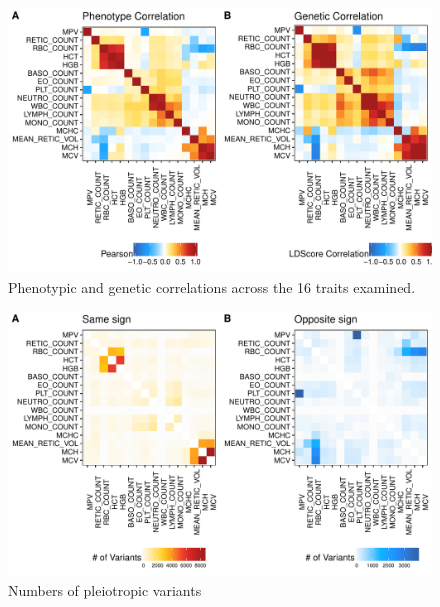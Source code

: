 \documentclass{article}\usepackage[]{graphicx}\usepackage[]{color}
\makeatletter
\def\maxwidth{ %
  \ifdim\Gin@nat@width>\linewidth
    \linewidth
  \else
    \Gin@nat@width
  \fi
}
\newenvironment{knitrout}{}{} %
\makeatother
\begin{document}
\begin{enumerate}[label=(\Alph*)]
\begin{knitrout}
\begin{figure}[H]
{\centering \includegraphics[width=\maxwidth]{figure/correlationPlots-1} 

}

\caption[Phenotypic and genetic correlations across the 16 traits examined]{Phenotypic and genetic correlations across the 16 traits examined. }\label{fig:correlationPlots}
\end{figure}


\end{knitrout}



\begin{knitrout}
\color{fgcolor}\begin{figure}[H]

{\centering \includegraphics[width=\maxwidth]{figure/pleiotropyPlots-1} 

}

\caption[Numbers of pleiotropic variants]{Numbers of pleiotropic variants}\label{fig:pleiotropyPlots}
\end{figure}



\end{knitrout}
\end{enumerate}
\end{document}
